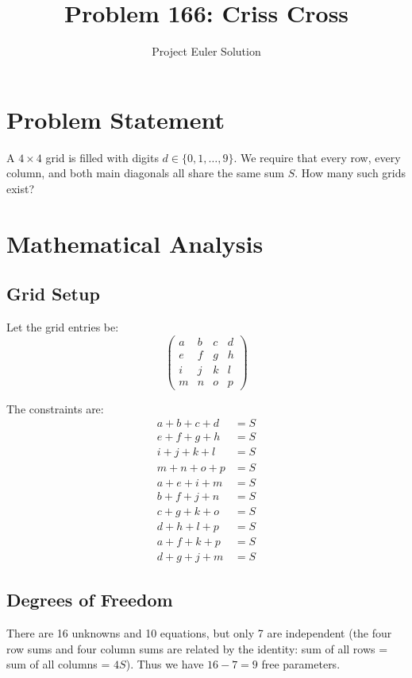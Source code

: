 \documentclass[11pt]{article}
\title{Problem 166: Criss Cross}
\author{Project Euler Solution}
\date{}
\begin{document}
\maketitle

\section{Problem Statement}
A $4\times 4$ grid is filled with digits $d \in \{0,1,\ldots,9\}$. We require that every row, every column, and both main diagonals all share the same sum $S$. How many such grids exist?

\section{Mathematical Analysis}

\subsection{Grid Setup}
Let the grid entries be:
\[
\begin{pmatrix}
a & b & c & d \\
e & f & g & h \\
i & j & k & l \\
m & n & o & p
\end{pmatrix}
\]

The constraints are:
\begin{align}
a+b+c+d &= S \label{eq:r1}\\
e+f+g+h &= S \label{eq:r2}\\
i+j+k+l &= S \label{eq:r3}\\
m+n+o+p &= S \label{eq:r4}\\
a+e+i+m &= S \label{eq:c1}\\
b+f+j+n &= S \label{eq:c2}\\
c+g+k+o &= S \label{eq:c3}\\
d+h+l+p &= S \label{eq:c4}\\
a+f+k+p &= S \label{eq:d1}\\
d+g+j+m &= S \label{eq:d2}
\end{align}

\subsection{Degrees of Freedom}
There are 16 unknowns and 10 equations, but only 7 are independent (the four row sums and four column sums are related by the identity: sum of all rows = sum of all columns = $4S$). Thus we have $16 - 7 = 9$ free parameters.
\end{document}

